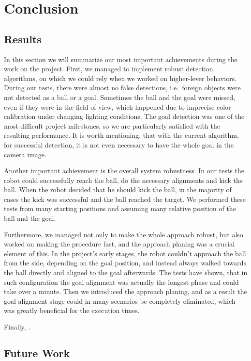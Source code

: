 \chapter{Conclusion}

\section{Results}

In this section we will summarize our most important achievements during the
work on the project. First, we managed to implement robust detection
algorithms, on which we could rely when we worked on higher-lever behaviors.
During our tests, there were almost no false detections, i.e.\ foreign objects
were not detected as a ball or a goal. Sometimes the ball and the goal were
missed, even if they were in the field of view, which happened due to imprecise
color calibration under changing lighting conditions. The goal detection was
one of the most difficult project milestones, so we are particularly satisfied
with the resulting performance. It is worth mentioning, that with the current
algorithm, for successful detection, it is not even necessary to have the whole
goal in the camera image.

Another important achievement is the overall system robustness. In our tests
the robot could successfully reach the ball, do the necessary alignments and
kick the ball. When the robot decided that he should kick the ball, in the
majority of cases the kick was successful and the ball reached the target. We
performed these tests from many starting positions and assuming many relative
position of the ball and the goal.

Furthermore, we managed not only to make the whole approach robust, but also
worked on making the procedure fast, and the approach planing was a crucial
element of this. In the project's early stages, the robot couldn't approach the
ball from the side, depending on the goal position, and instead always walked
towards the ball directly and aligned to the goal afterwards. The tests have
shown, that in such configuration the goal alignment was actually the longest
phase and could take over a minute. Then we introduced the approach planing,
and as a result the goal alignment stage could in many scenarios be completely
eliminated, which was greatly beneficial for the execution times.

Finally, .

\section{Future Work}

